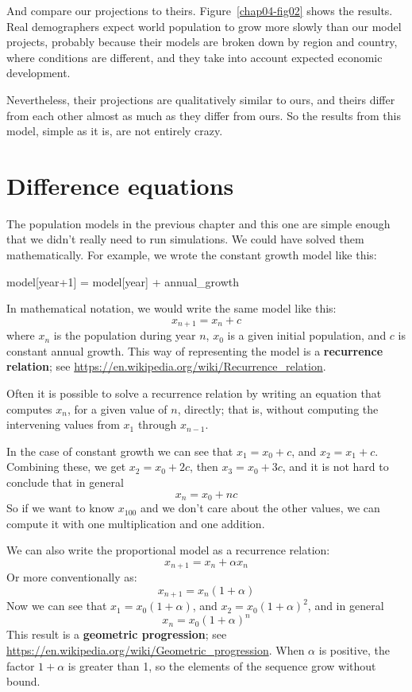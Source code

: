 \documentclass[12pt]{book}
\theoremstyle{exercise}
\begin{document}
And compare our projections to theirs.  Figure~\ref{chap04-fig02} shows the results.  Real demographers expect world population to grow more slowly than our model projects, probably because their models are broken down by region and country, where conditions are different, and they take into account expected economic development.

Nevertheless, their projections are qualitatively similar to ours, and theirs differ from each other almost as much as they differ from ours.  So the results from this model, simple as it is, are not entirely crazy.


\section{Difference equations}

The population models in the previous chapter and this one are simple enough that we didn't really need to run simulations.  We could have solved them mathematically.  For example, we wrote the constant growth model like this:

\begin{python}
model[year+1] = model[year] + annual_growth
\end{python}

In mathematical notation, we would write the same model like this:
%
\[ x_{n+1} = x_n + c \]
%
where $x_n$ is the population during year $n$, $x_0$ is a given initial population, and $c$ is constant annual growth.  This way of representing the model is a {\bf recurrence relation}; see \url{https://en.wikipedia.org/wiki/Recurrence_relation}.

Often it is possible to solve a recurrence relation by writing an equation that computes $x_n$, for a given value of $n$, directly; that is, without computing the intervening values from $x_1$ through $x_{n-1}$.

In the case of constant growth we can see that $x_1 = x_0 + c$, and $x_2 = x_1 + c$.  Combining these, we get $x_2 = x_0 + 2c$, then $x_3 = x_0 + 3c$, and it is not hard to conclude that in general
%
\[ x_n = x_0 + nc \]
%
So if we want to know $x_{100}$ and we don't care about the other values, we can compute it with one multiplication and one addition.

We can also write the proportional model as a recurrence relation:
%
\[ x_{n+1} = x_n + \alpha x_n \]
%
Or more conventionally as:
%
\[ x_{n+1} = x_n (1 + \alpha) \]
%
Now we can see that $x_1 = x_0 (1 + \alpha)$, and $x_2 = x_0 (1 + \alpha)^2$, and in general
%
\[ x_n = x_0 (1 + \alpha)^n \]
%
This result is a {\bf geometric progression}; see \url{https://en.wikipedia.org/wiki/Geometric_progression}.  When $\alpha$ is positive, the factor $1+\alpha$ is greater than 1, so the elements of the sequence grow without bound.
\end{document}
